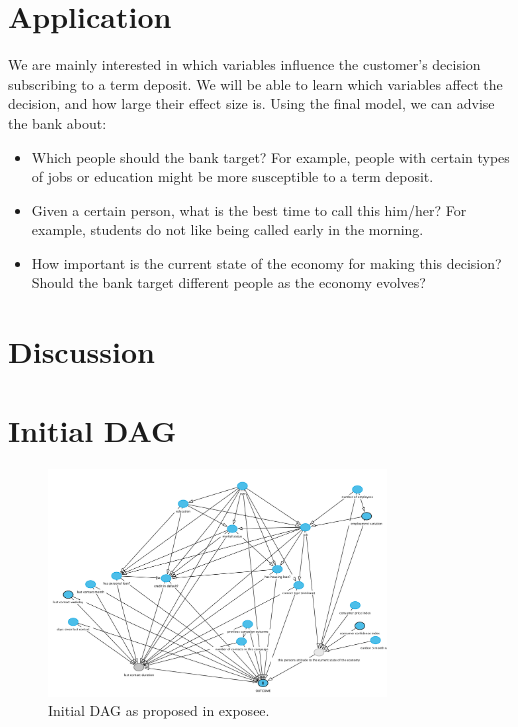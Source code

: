 \documentclass[11pt,]{article}
\providecommand{\tightlist}{%
  \setlength{\itemsep}{0pt}\setlength{\parskip}{0pt}}
\begin{document}
\begin{multicols}{2}
\hypertarget{application}{%
\section{Application}\label{application}}

We are mainly interested in which variables influence the customer's
decision subscribing to a term deposit. We will be able to learn which
variables affect the decision, and how large their effect size is. Using
the final model, we can advise the bank about:

\begin{itemize}
\tightlist
\item
  Which people should the bank target? For example, people with certain
  types of jobs or education might be more susceptible to a term
  deposit.
\item
  Given a certain person, what is the best time to call this him/her?
  For example, students do not like being called early in the morning.
\item
  How important is the current state of the economy for making this
  decision? Should the bank target different people as the economy
  evolves?
\end{itemize}

\hypertarget{discussion}{%
\section{Discussion}\label{discussion}}

\end{multicols}
\newpage
\appendix

\hypertarget{initial-dag}{%
\section{Initial DAG}\label{initial-dag}}

\label{sec:initial_dag}

\begin{figure}[h]
    \centering
    \includegraphics[width=0.8\textwidth]{images/initial_dag}
    \caption{Initial DAG as proposed in exposee.}
    \label{fig:initial_dag}
\end{figure}
\end{document}
